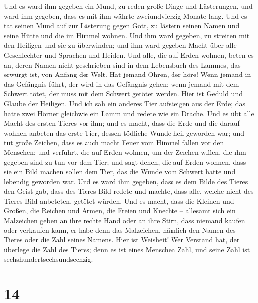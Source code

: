  Und es ward ihm gegeben ein Mund, zu reden große Dinge
und Lästerungen, und ward ihm gegeben, dass es mit ihm währte
zweiundvierzig Monate lang.  Und es tat seinen Mund auf
zur Lästerung gegen Gott, zu lästern seinen Namen und seine Hütte und
die im Himmel wohnen.  Und ihm ward gegeben, zu streiten
mit den Heiligen und sie zu überwinden; und ihm ward gegeben Macht über
alle Geschlechter und Sprachen und Heiden.  Und alle, die
auf Erden wohnen, beten es an, deren Namen nicht geschrieben sind in dem
Lebensbuch des Lammes, das erwürgt ist, von Anfang der Welt.
 Hat jemand Ohren, der höre!  Wenn jemand
in das Gefängnis führt, der wird in das Gefängnis gehen; wenn jemand mit
dem Schwert tötet, der muss mit dem Schwert getötet werden. Hier ist
Geduld und Glaube der Heiligen.  Und ich sah ein anderes
Tier aufsteigen aus der Erde; das hatte zwei Hörner gleichwie ein Lamm
und redete wie ein Drache.  Und es übt alle Macht des
ersten Tieres vor ihm; und es macht, dass die Erde und die darauf wohnen
anbeten das erste Tier, dessen tödliche Wunde heil geworden war;
 und tut große Zeichen, dass es auch macht Feuer vom
Himmel fallen vor den Menschen;  und verführt, die auf
Erden wohnen, um der Zeichen willen, die ihm gegeben sind zu tun vor dem
Tier; und sagt denen, die auf Erden wohnen, dass sie ein Bild machen
sollen dem Tier, das die Wunde vom Schwert hatte und lebendig geworden
war.  Und es ward ihm gegeben, dass es dem Bilde des
Tieres den Geist gab, dass des Tieres Bild redete und machte, dass alle,
welche nicht des Tieres Bild anbeteten, getötet würden. 
Und es macht, dass die Kleinen und Großen, die Reichen und Armen, die
Freien und Knechte -- allesamt sich ein Malzeichen geben an ihre rechte
Hand oder an ihre Stirn,  dass niemand kaufen oder
verkaufen kann, er habe denn das Malzeichen, nämlich den Namen des
Tieres oder die Zahl seines Namens.  Hier ist Weisheit!
Wer Verstand hat, der überlege die Zahl des Tieres; denn es ist eines
Menschen Zahl, und seine Zahl ist sechshundertsechsundsechzig.

\hypertarget{section-13}{%
\section{14}\label{section-13}}

